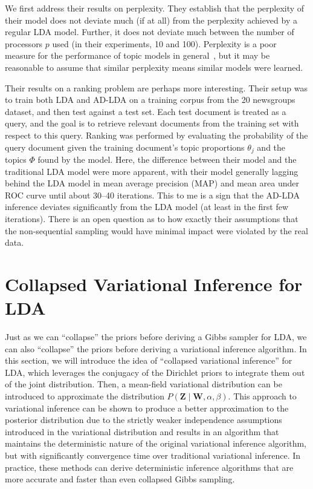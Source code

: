 \documentclass[11pt]{article}
\begin{document}
We first address their results on perplexity. They establish that the
perplexity of their model does not deviate much (if at all) from the
perplexity achieved by a regular LDA model. Further, it does not deviate
much between the number of processors $p$ used (in their experiments, 10
and 100). Perplexity is a poor measure for the performance of topic models
in general~\cite{Chang:2009:tealeaves}, but it may be reasonable to assume
that similar perplexity means similar models were learned.

Their results on a ranking problem are perhaps more interesting. Their
setup was to train both LDA and AD-LDA on a training corpus from the 20
newsgroups dataset, and then test against a test set. Each test document is
treated as a query, and the goal is to retrieve relevant documents from the
training set with respect to this query. Ranking was performed by
evaluating the probability of the query document given the training
document's topic proportions $\theta_j$ and the topics $\Phi$ found by the
model. Here, the difference between their model and the traditional LDA
model were more apparent, with their model generally lagging behind the LDA
model in mean average precision (MAP) and mean area under ROC curve until
about 30--40 iterations. This to me is a sign that the AD-LDA inference
deviates significantly from the LDA model (at least in the first few
iterations). There is an open question as to how exactly their assumptions
that the non-sequential sampling would have minimal impact were violated by
the real data.

\section{Collapsed Variational Inference for LDA}
Just as we can ``collapse'' the priors before deriving a Gibbs sampler for
LDA, we can also ``collapse'' the priors before deriving a variational
inference algorithm. In this section, we will introduce the idea of
``collapsed variational inference'' for LDA, which leverages the conjugacy
of the Dirichlet priors to integrate them out of the joint distribution.
Then, a mean-field variational distribution can be introduced to
approximate the distribution $P(\mathbf{Z} \mid \mathbf{W}, \alpha,
\beta)$. This approach to variational inference can be shown to produce a
better approximation to the posterior distribution due to the strictly
weaker independence assumptions introduced in the variational distribution
and results in an algorithm that maintains the deterministic nature of the
original variational inference algorithm, but with significantly
convergence time over traditional variational inference. In practice, these
methods can derive deterministic inference algorithms that are more
accurate and faster than even collapsed Gibbs sampling.
\end{document}

